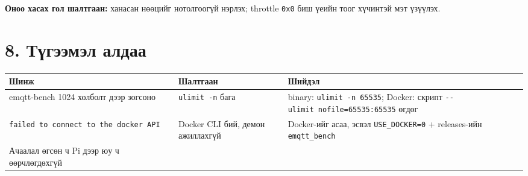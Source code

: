 \textbf{Оноо хасах гол шалтгаан:} ханасан нөөцийг нотолгоогүй нэрлэх; throttle \texttt{0x0} биш үеийн тоог хүчинтэй мэт үзүүлэх.

\hypertarget{ux442ux4afux433ux44dux44dux43cux44dux43b-ux430ux43bux434ux430ux430}{%
\section{8. Түгээмэл алдаа}\label{ux442ux4afux433ux44dux44dux43cux44dux43b-ux430ux43bux434ux430ux430}}

\begingroup\scriptsize\begin{longtable}[]{@{}lll@{}}
\toprule
\begin{minipage}[b]{0.30\columnwidth}\raggedright
Шинж\strut
\end{minipage} & \begin{minipage}[b]{0.30\columnwidth}\raggedright
Шалтгаан\strut
\end{minipage} & \begin{minipage}[b]{0.30\columnwidth}\raggedright
Шийдэл\strut
\end{minipage}\tabularnewline
\midrule
\endhead
\begin{minipage}[t]{0.30\columnwidth}\raggedright
emqtt-bench 1024 холболт дээр зогсоно\strut
\end{minipage} & \begin{minipage}[t]{0.30\columnwidth}\raggedright
\texttt{ulimit\ -n} бага\strut
\end{minipage} & \begin{minipage}[t]{0.30\columnwidth}\raggedright
binary: \texttt{ulimit\ -n\ 65535}; Docker: скрипт \texttt{-\/\allowbreak{}-ulimit\ nofile=\allowbreak{}65535:\allowbreak{}65535} өгдөг\strut
\end{minipage}\tabularnewline
\begin{minipage}[t]{0.30\columnwidth}\raggedright
\texttt{failed\ to\ connect\ to\ the\ docker\ API}\strut
\end{minipage} & \begin{minipage}[t]{0.30\columnwidth}\raggedright
Docker CLI бий, демон ажиллахгүй\strut
\end{minipage} & \begin{minipage}[t]{0.30\columnwidth}\raggedright
Docker-ийг асаа, эсвэл \texttt{USE\_DOCKER=0} + releases-ийн \texttt{emqtt\_bench}\strut
\end{minipage}\tabularnewline
\begin{minipage}[t]{0.30\columnwidth}\raggedright
Ачаалал өгсөн ч Pi дээр юу ч өөрчлөгдөхгүй\strut

\end{minipage}
\end{longtable}
